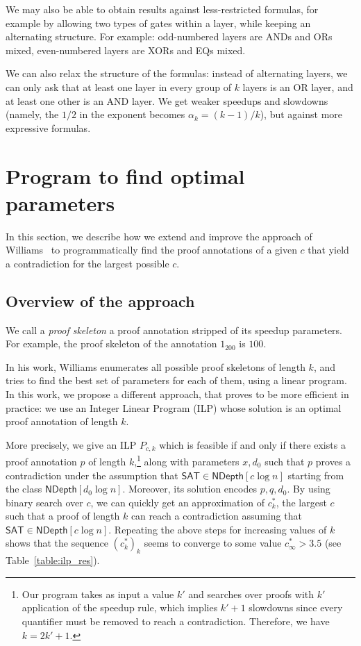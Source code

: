\documentclass[a4paper, 11pt]{article}
\theoremstyle{plain}
\theoremstyle{definition}
\theoremstyle{remark}
\newcommand{\SAT}{\textsf{SAT}}%
\newcommand{\ND}{\textsf{NDepth}}%
\newcommand{\NDL}[1]{\ND\left[ #1 \log n\right]}%
\begin{document}
We may also be able to obtain results against less-restricted formulas,
for example by allowing two types of gates within a layer,
while keeping an alternating structure.
For example: odd-numbered layers are ANDs and ORs mixed,
even-numbered layers are XORs and EQs mixed.


We can also relax the structure of the formulas: 
instead of alternating layers, we can only ask
that at least one layer in every group of $k$ layers
is an OR layer, and at least one other is an AND layer.
We get weaker speedups and slowdowns
(namely, the $1/2$ in the exponent becomes $\alpha_k = (k-1)/k$),
but against more expressive formulas. 


\appendix
\section{Program to find optimal parameters}\label{app:ilp}


In this section, we describe how we extend and improve 
the approach of Williams~\cite{williams2006inductive, williams2007time} 
to programmatically find the proof annotations of a given $c$ that yield a contradiction
for the largest possible $c$.

\subsection{Overview of the approach}
We call a \textit{proof skeleton} a proof annotation stripped of its speedup parameters.
For example, the proof skeleton of the annotation $1_200$ is $100$.

In his work, Williams enumerates all possible proof skeletons of length $k$,
and tries to find the best set of parameters for each of them, using a linear program.
In this work, we propose a different approach, that proves to be more efficient in practice:
we use an Integer Linear Program (ILP) whose solution is
an optimal proof annotation of length $k$.

More precisely, we give an ILP $P_{c,k}$ which is feasible if and only if
there exists a proof annotation $p$ of length $k$,\footnote{Our program takes as input a value $k'$ and searches over proofs with $k'$ application of the speedup rule, which implies $k'+1$ slowdowns since every quantifier must be removed to reach a contradiction. Therefore, we have $k = 2k'+1$.} along with parameters $x, d_0$
such that $p$ proves a contradiction under the assumption that $\SAT\in\NDL{c}$
starting from the class $\NDL{d_0}$.
Moreover, its solution encodes $p,q,d_0$.
By using binary search over $c$, we can quickly get an approximation 
of $c_k^*$, the largest $c$ such that a proof of length $k$ 
can reach a contradiction assuming that $\SAT\in\NDL{c}$.
Repeating the above steps for increasing values of $k$ shows that the sequence $(c_k^*)_{k}$
seems to converge to some value $c_\infty^* > 3.5$ (see Table~\ref{table:ilp_res}).
\end{document}
